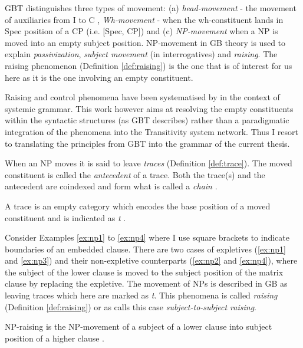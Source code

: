     GBT distinguishes three types of movement: (a) \textit{head-movement} - the movement of auxiliaries from I to C , \textit{Wh-movement} - when the wh-constituent lands in Spec position of a CP (i.e. [Spec, CP]) and (c) \textit{NP-movement} when a NP is moved into an empty subject position. 
    NP-movement in GB theory is used to explain \textit{passivization}, \textit{subject movement} (in interrogatives) and \textit{raising}. The raising phenomenon (Definition \ref{def:raising}) is the one that is of interest for us here as it is the one involving an empty constituent. 
    
    Raising and control phenomena have been systematised by \citet{Elke1991-raising-control} in the context of systemic grammar. This work however aims at resolving the empty constituents within the syntactic structures (as GBT describes) rather than a paradigmatic integration of the phenomena into the Transitivity system network. Thus I resort to translating the principles from GBT into the grammar of the current thesis.

    When an NP moves it is said to leave \textit{traces} (Definition \ref{def:trace}). The moved constituent is called the \textit{antecedent} of a trace. Both the trace(s) and the antecedent are coindexed and form what is called a \textit{chain} \citep[309]{Haegeman1991}.
 
        \begin{definition}[Trace]\label{def:trace}
            A trace is an empty category which encodes the base position of a moved constituent and is indicated as \textit{t} \citep[309]{Haegeman1991}. 
        \end{definition}

    Consider Examples \ref{ex:np1} to \ref{ex:np4} where I use square brackets to indicate boundaries of an embedded clause. There are two cases of expletives (\ref{ex:np1} and \ref{ex:np3}) and their non-expletive counterparts (\ref{ex:np2} and \ref{ex:np4}), where the subject of the lower clause is moved to the subject position of the matrix clause by replacing the expletive. The movement of NPs is described in GB as leaving traces which here are marked as \textit{t}. This phenomena is called \textit{raising} (Definition \ref{def:raising}) or as \citet{Postal1974} calls this case \textit{subject-to-subject raising}.
    
    \begin{definition}[NP-raising]\label{def:raising}
    	NP-raising is the NP-movement of a subject of a lower clause into subject position of a higher clause \citep[306]{Haegeman1991}. 
    \end{definition}
    
